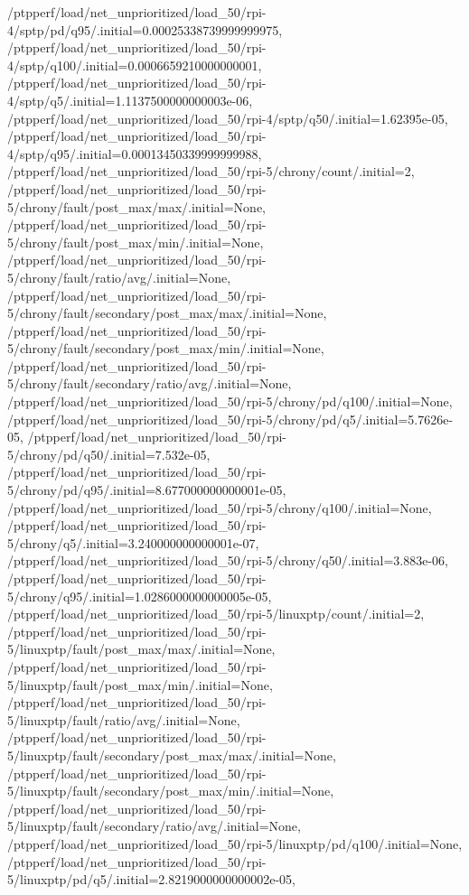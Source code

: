 {    /ptpperf/load/net_unprioritized/load_50/rpi-4/sptp/pd/q95/.initial=0.00025338739999999975,
    /ptpperf/load/net_unprioritized/load_50/rpi-4/sptp/q100/.initial=0.0006659210000000001,
    /ptpperf/load/net_unprioritized/load_50/rpi-4/sptp/q5/.initial=1.1137500000000003e-06,
    /ptpperf/load/net_unprioritized/load_50/rpi-4/sptp/q50/.initial=1.62395e-05,
    /ptpperf/load/net_unprioritized/load_50/rpi-4/sptp/q95/.initial=0.00013450339999999988,
    /ptpperf/load/net_unprioritized/load_50/rpi-5/chrony/count/.initial=2,
    /ptpperf/load/net_unprioritized/load_50/rpi-5/chrony/fault/post_max/max/.initial=None,
    /ptpperf/load/net_unprioritized/load_50/rpi-5/chrony/fault/post_max/min/.initial=None,
    /ptpperf/load/net_unprioritized/load_50/rpi-5/chrony/fault/ratio/avg/.initial=None,
    /ptpperf/load/net_unprioritized/load_50/rpi-5/chrony/fault/secondary/post_max/max/.initial=None,
    /ptpperf/load/net_unprioritized/load_50/rpi-5/chrony/fault/secondary/post_max/min/.initial=None,
    /ptpperf/load/net_unprioritized/load_50/rpi-5/chrony/fault/secondary/ratio/avg/.initial=None,
    /ptpperf/load/net_unprioritized/load_50/rpi-5/chrony/pd/q100/.initial=None,
    /ptpperf/load/net_unprioritized/load_50/rpi-5/chrony/pd/q5/.initial=5.7626e-05,
    /ptpperf/load/net_unprioritized/load_50/rpi-5/chrony/pd/q50/.initial=7.532e-05,
    /ptpperf/load/net_unprioritized/load_50/rpi-5/chrony/pd/q95/.initial=8.677000000000001e-05,
    /ptpperf/load/net_unprioritized/load_50/rpi-5/chrony/q100/.initial=None,
    /ptpperf/load/net_unprioritized/load_50/rpi-5/chrony/q5/.initial=3.240000000000001e-07,
    /ptpperf/load/net_unprioritized/load_50/rpi-5/chrony/q50/.initial=3.883e-06,
    /ptpperf/load/net_unprioritized/load_50/rpi-5/chrony/q95/.initial=1.0286000000000005e-05,
    /ptpperf/load/net_unprioritized/load_50/rpi-5/linuxptp/count/.initial=2,
    /ptpperf/load/net_unprioritized/load_50/rpi-5/linuxptp/fault/post_max/max/.initial=None,
    /ptpperf/load/net_unprioritized/load_50/rpi-5/linuxptp/fault/post_max/min/.initial=None,
    /ptpperf/load/net_unprioritized/load_50/rpi-5/linuxptp/fault/ratio/avg/.initial=None,
    /ptpperf/load/net_unprioritized/load_50/rpi-5/linuxptp/fault/secondary/post_max/max/.initial=None,
    /ptpperf/load/net_unprioritized/load_50/rpi-5/linuxptp/fault/secondary/post_max/min/.initial=None,
    /ptpperf/load/net_unprioritized/load_50/rpi-5/linuxptp/fault/secondary/ratio/avg/.initial=None,
    /ptpperf/load/net_unprioritized/load_50/rpi-5/linuxptp/pd/q100/.initial=None,
    /ptpperf/load/net_unprioritized/load_50/rpi-5/linuxptp/pd/q5/.initial=2.8219000000000002e-05,
}
